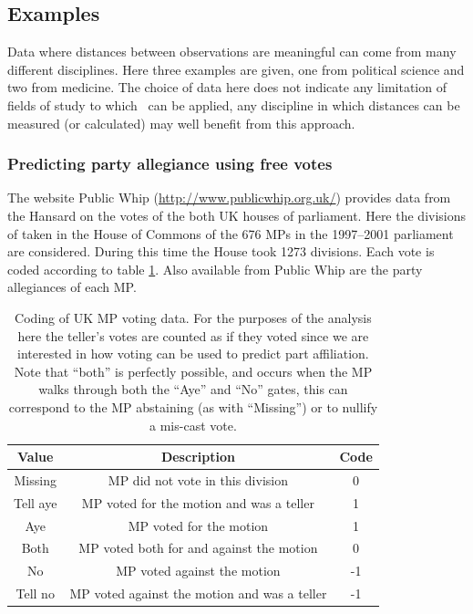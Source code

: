 \subsection{Examples}
\label{gds-examples}

Data where distances between observations are meaningful can come from many different disciplines. Here three examples are given, one from political science and two from medicine. The choice of data here does not indicate any limitation of fields of study to which \mdsds\ can be applied, any discipline in which distances can be measured (or calculated) may well benefit from this approach.

\subsubsection{Predicting party allegiance using free votes}

The website Public Whip (\url{http://www.publicwhip.org.uk/}) provides data from the Hansard on the votes of the both UK houses of parliament. Here the divisions of taken in the House of Commons of the 676 MPs in the 1997--2001 parliament are considered. During this time the House took 1273 divisions. Each vote is coded according to table \ref{voting-code}. Also available from Public Whip are the party allegiances of each MP. 

\begin{table}  
\begin{centering}
\begin{tabular}{ccc}
    Value & Description & Code \\ 
    \hline
    Missing & MP did not vote in this division & 0 \\ 
    Tell aye & MP voted for the motion and was a teller & 1 \\ 
    Aye & MP voted for the motion & 1 \\ 
    Both & MP voted both for  and against the motion & 0 \\ 
    No & MP voted against the motion & -1 \\ 
    Tell no & MP voted against the motion and was a teller & -1 \\ 
  \end{tabular}
\caption{Coding of UK MP voting data. For the purposes of the analysis here the teller's votes are counted as if they voted since we are interested in how voting can be used to predict part affiliation. Note that ``both'' is perfectly possible, and occurs when the MP walks through both the ``Aye'' and ``No'' gates, this can correspond to the MP abstaining (as with ``Missing'') or to nullify a mis-cast vote.}
\label{voting-code}
\end{centering}
\end{table}

